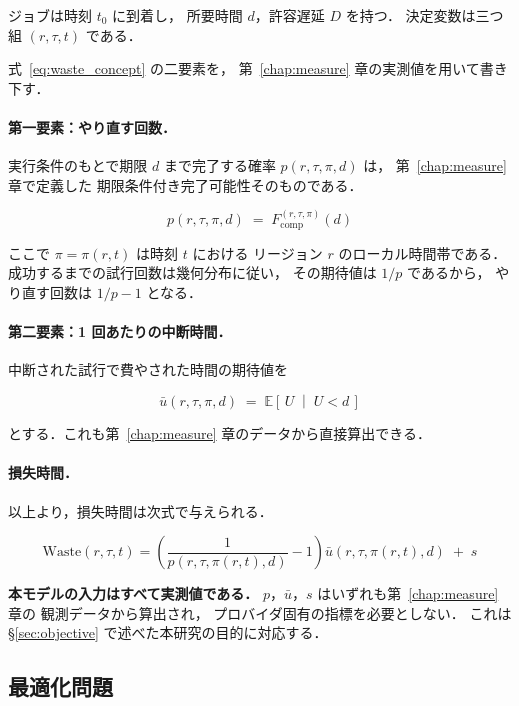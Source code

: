 \documentclass[11pt,a4paper]{ltjsreport}
\newcommand{\Fcomp}{F_{\mathrm{comp}}}
\newcommand{\E}{\mathbb{E}}
\newcommand{\Waste}{\mathrm{Waste}}
\begin{document}
ジョブは時刻 $t_0$ に到着し，
所要時間 $d$，許容遅延 $D$ を持つ．
決定変数は三つ組 $(r, \tau, t)$ である．

式~\eqref{eq:waste_concept} の二要素を，
第~\ref{chap:measure} 章の実測値を用いて書き下す．

\paragraph{第一要素：やり直す回数．}
実行条件のもとで期限 $d$ まで完了する確率
$p(r,\tau,\pi,d)$ は，
第~\ref{chap:measure} 章で定義した
期限条件付き完了可能性そのものである．

\begin{equation}
p(r,\tau,\pi,d) \;=\; \Fcomp^{(r,\tau,\pi)}(d)
\label{eq:p_is_fcomp}
\end{equation}

ここで $\pi = \pi(r,t)$ は時刻 $t$ における
リージョン $r$ のローカル時間帯である．
成功するまでの試行回数は幾何分布に従い，
その期待値は $1/p$ であるから，
やり直す回数は $1/p - 1$ となる．

\paragraph{第二要素：1 回あたりの中断時間．}
中断された試行で費やされた時間の期待値を

\begin{equation}
\bar u(r,\tau,\pi,d) \;=\; \E\!\left[\,U \;\middle|\; U < d\,\right]
\label{eq:ubar}
\end{equation}

とする．これも第~\ref{chap:measure} 章のデータから直接算出できる．

\paragraph{損失時間．}
以上より，損失時間は次式で与えられる．

\begin{equation}
\boxed{\;
\Waste(r,\tau,t)
=
\left( \frac{1}{p(r,\tau,\pi(r,t),d)} - 1 \right)
\bar u(r,\tau,\pi(r,t),d)
\;+\; s
\;}
\label{eq:waste}
\end{equation}

\textbf{本モデルの入力はすべて実測値である．}
$p$，$\bar u$，$s$ はいずれも第~\ref{chap:measure} 章の
観測データから算出され，
プロバイダ固有の指標を必要としない．
これは\S\ref{sec:objective} で述べた本研究の目的に対応する．

\subsection{最適化問題}
\end{document}
